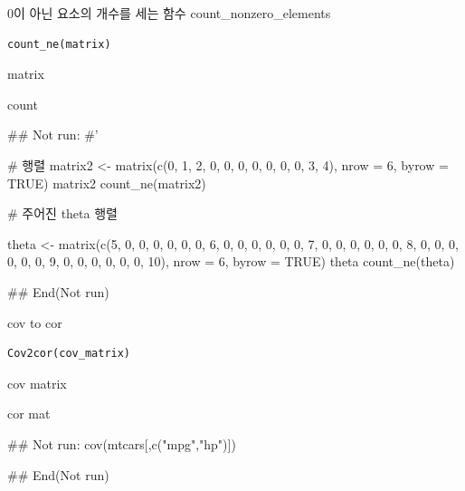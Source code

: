 \documentclass[a4paper]{book}
\begin{document}
%
\begin{Description}
0이 아닌 요소의 개수를 세는 함수 count\_nonzero\_elements
\end{Description}
%
\begin{Usage}
\begin{verbatim}
count_ne(matrix)
\end{verbatim}
\end{Usage}
%
\begin{Arguments}
\begin{ldescription}
\item[\code{matrix}] matrix
\end{ldescription}
\end{Arguments}
%
\begin{Value}
count
\end{Value}
%
\begin{Examples}
\begin{ExampleCode}

\#\# Not run: 
#'

#  행렬
matrix2 <- matrix(c(0, 1, 2, 0, 0, 0,
                    0, 0, 0, 0, 3, 4), nrow = 6, byrow = TRUE)
matrix2
count_ne(matrix2)

# 주어진 theta 행렬

theta <- matrix(c(5, 0, 0, 0, 0, 0,
                  0, 6, 0, 0, 0, 0,
                  0, 0, 7, 0, 0, 0,
                  0, 0, 0, 8, 0, 0,
                  0, 0, 0, 0, 9, 0,
                  0, 0, 0, 0, 0, 10), nrow = 6, byrow = TRUE)
theta
count_ne(theta)

## End(Not run)

\end{ExampleCode}
\end{Examples}

%
\begin{Description}
cov to cor
\end{Description}
%
\begin{Usage}
\begin{verbatim}
Cov2cor(cov_matrix)
\end{verbatim}
\end{Usage}
%
\begin{Arguments}
\begin{ldescription}
\item[\code{cov\_matrix}] cov matrix
\end{ldescription}
\end{Arguments}
%
\begin{Value}
cor mat
\end{Value}
%
\begin{Examples}
\begin{ExampleCode}

\#\# Not run: 
cov(mtcars[,c("mpg","hp")])%

## End(Not run)
\end{ExampleCode}
\end{Examples}
\end{document}
